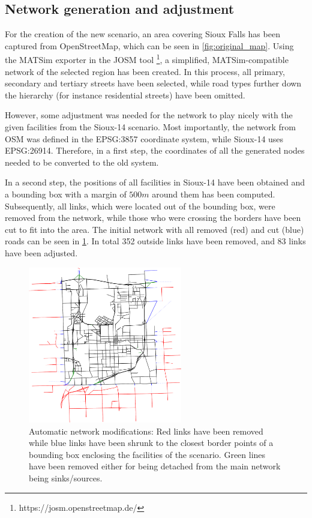 \subsection{Network generation and adjustment}

For the creation of the new scenario, an area covering Sioux Falls has been captured
from OpenStreetMap, which can be seen in \cref{fig:original_map}. Using the MATSim
exporter in the JOSM tool \footnote{https://josm.openstreetmap.de/}, a simplified,
MATSim-compatible network of the selected region has been created. In this process,
all primary, secondary and tertiary streets have been selected, while road types
further down the hierarchy (for instance residential streets) have been omitted.

However, some adjustment was needed for the network to play nicely with
the given facilities from the Sioux-14 scenario. Most importantly, the network from
OSM was defined in the EPSG:3857 coordinate system, while Sioux-14 uses EPSG:26914.
Therefore, in a first step, the coordinates of all the generated nodes needed to
be converted to the old system.

In a second step, the positions of all facilities in Sioux-14 have been obtained
and a bounding box with a margin of $500m$ around them has been computed. Subsequently,
all links, which were located out of the bounding box, were removed from the network,
while those who were crossing the borders have been cut to fit into the area. The
initial network with all removed (red) and cut (blue) roads can be seen in \cref{fig:sioux_step2}.
In total 352 outside links have been removed, and 83 links have been adjusted.

\begin{figure}
    \centering
    \includegraphics[width=0.6\textwidth]{figures/sioux_step2_cropped.pdf}
    \caption{Automatic network modifications: Red links have been removed while
    blue links have been shrunk to the closest border points of a bounding box
    enclosing the facilities of the scenario. Green lines have been removed either
    for being detached from the main network being sinks/sources.}
    \label{fig:sioux_step2}
\end{figure}

